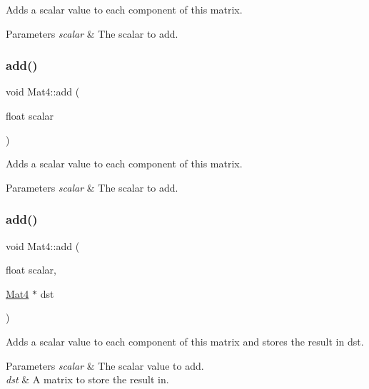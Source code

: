 Adds a scalar value to each component of this matrix.


\begin{DoxyParams}{Parameters}
{\em scalar} & The scalar to add. \\
\hline
\end{DoxyParams}
\mbox{\label{classMat4_aa33c5fad52aba88880b36d95c6ae85ae}} 
\subsubsection{\texorpdfstring{add()}{add()}\hspace{0.1cm}{\footnotesize\ttfamily [2/8]}}
{\footnotesize\ttfamily void Mat4\+::add (\begin{DoxyParamCaption}\item[{float}]{scalar }\end{DoxyParamCaption})}

Adds a scalar value to each component of this matrix.


\begin{DoxyParams}{Parameters}
{\em scalar} & The scalar to add. \\
\hline
\end{DoxyParams}
\mbox{\label{classMat4_a686767982006e42351c87a027af12c17}} 
\subsubsection{\texorpdfstring{add()}{add()}\hspace{0.1cm}{\footnotesize\ttfamily [3/8]}}
{\footnotesize\ttfamily void Mat4\+::add (\begin{DoxyParamCaption}\item[{float}]{scalar,  }\item[{\hyperlink{classMat4}{Mat4} $\ast$}]{dst }\end{DoxyParamCaption})}

Adds a scalar value to each component of this matrix and stores the result in dst.


\begin{DoxyParams}{Parameters}
{\em scalar} & The scalar value to add. \\
\hline
{\em dst} & A matrix to store the result in. \\
\hline
\end{DoxyParams}
\mbox{\label{classMat4_a686767982006e42351c87a027af12c17}} 
